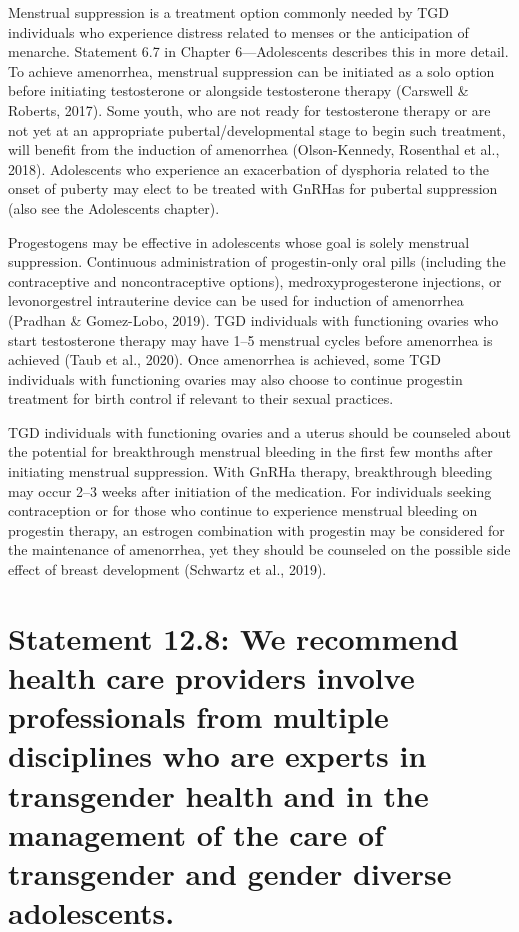 \documentclass[
]{book}
\begin{document}
Menstrual suppression is a treatment option
commonly needed by TGD individuals who experience distress related to menses or the anticipation of menarche. Statement 6.7 in Chapter
6---Adolescents describes this in more detail. To
achieve amenorrhea, menstrual suppression can
be initiated as a solo option before initiating testosterone or alongside testosterone therapy
(Carswell \& Roberts, 2017). Some youth, who are
not ready for testosterone therapy or are not yet
at an appropriate pubertal/developmental stage
to begin such treatment, will benefit from the
induction of amenorrhea (Olson-Kennedy,
Rosenthal et al., 2018). Adolescents who experience an exacerbation of dysphoria related to the
onset of puberty may elect to be treated with
GnRHas for pubertal suppression (also see the
Adolescents chapter).

Progestogens may be effective in adolescents
whose goal is solely menstrual suppression.
Continuous administration of progestin-only oral
pills (including the contraceptive and noncontraceptive options), medroxyprogesterone injections,
or levonorgestrel intrauterine device can be used
for induction of amenorrhea (Pradhan \&
Gomez-Lobo, 2019). TGD individuals with functioning ovaries who start testosterone therapy
may have 1--5 menstrual cycles before amenorrhea is achieved (Taub et al., 2020). Once amenorrhea is achieved, some TGD individuals with
functioning ovaries may also choose to continue
progestin treatment for birth control if relevant
to their sexual practices.

TGD individuals with functioning ovaries and
a uterus should be counseled about the potential
for breakthrough menstrual bleeding in the first
few months after initiating menstrual suppression.
With GnRHa therapy, breakthrough bleeding may
occur 2--3 weeks after initiation of the medication. For individuals seeking contraception or for
those who continue to experience menstrual
bleeding on progestin therapy, an estrogen combination with progestin may be considered for
the maintenance of amenorrhea, yet they should
be counseled on the possible side effect of breast
development (Schwartz et al., 2019).

\hypertarget{statement-12.8-we-recommend-health-care-providers-involve-professionals-from-multiple-disciplines-who-are-experts-in-transgender-health-and-in-the-management-of-the-care-of-transgender-and-gender-diverse-adolescents.}{%
\section*{Statement 12.8: We recommend health care providers involve professionals from multiple disciplines who are experts in transgender health and in the management of the care of transgender and gender diverse adolescents.}\label{statement-12.8-we-recommend-health-care-providers-involve-professionals-from-multiple-disciplines-who-are-experts-in-transgender-health-and-in-the-management-of-the-care-of-transgender-and-gender-diverse-adolescents.}}
\end{document}

